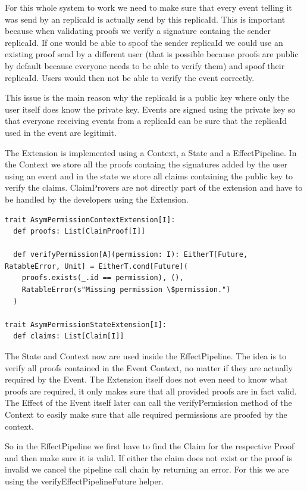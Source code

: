 \documentclass[
	ngerman,
	ruledheaders=section,   %
	class=report,		    %
	thesis={type=bachelor}, %
	accentcolor=9c,			%
	custommargins=true,    %
	marginpar=false,        %
	parskip=half-,          %
	fontsize=11pt,          %
]{tudapub}
\begin{document}
For this whole system to work we need to make sure that every event telling it was send by an replicaId is actually send by this replicaId. This is important because when validating proofs we verify a signature containg the sender replicaId. If one would be able to spoof the sender replicaId we could use an existing proof send by a different user (that is possible because proofs are public by default because everyone needs to be able to verify them) and spoof their replicaId. Users would then not be able to verify the event correctly. 

This issue is the main reason why the replicaId is a public key where only the user itself does know the private key. Events are signed using the private key so that everyone receiving events from a replicaId can be sure that the replicaId used in the event are legitimit.

The Extension is implemented using a Context, a State and a EffectPipeline. In the Context we store all the proofs containg the signatures added by the user using an event and in the state we store all claims containing the public key to verify the claims. ClaimProvers are not directly part of the extension and have to be handled by the developers using the Extension.

\begin{lstlisting}
trait AsymPermissionContextExtension[I]:
  def proofs: List[ClaimProof[I]]

  def verifyPermission[A](permission: I): EitherT[Future, RatableError, Unit] = EitherT.cond[Future](
    proofs.exists(_.id == permission), (),
    RatableError(s"Missing permission \$permission.")
  )

trait AsymPermissionStateExtension[I]:
  def claims: List[Claim[I]]
\end{lstlisting}

The State and Context now are used inside the EffectPipeline. The idea is to verify all proofs contained in the Event Context, no matter if they are actually required by the Event. The Extension itself does not even need to know what proofs are required, it only makes sure that all provided proofs are in fact valid. The Effect of the Event itself later can call the verifyPermission method of the Context to easily make sure that alle required permissions are proofed by the context.

So in the EffectPipeline we first have to find the Claim for the respective Proof and then make sure it is valid. If either the claim does not exist or the proof is invalid we cancel the pipeline call chain by returning an error. For this we are using the verifyEffectPipelineFuture helper.
\end{document}
